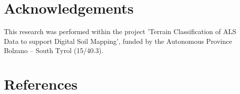 \documentclass[preprint,12pt,authoryear]{elsarticle}
\begin{document}
\section*{Acknowledgements} This research was performed within the project 'Terrain Classification of ALS Data to support Digital Soil Mapping', funded by the Autonomous Province Bolzano -- South Tyrol (15/40.3).

\section*{References}

\end{document}
